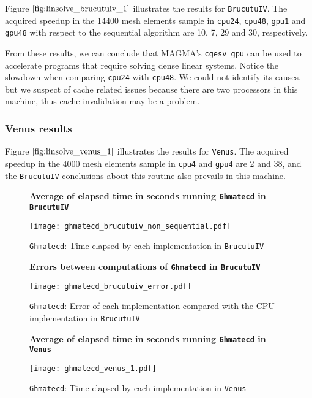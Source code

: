 Figure $\ref{fig:linsolve_brucutuiv_1}$ illustrates the results for \texttt{BrucutuIV}. The acquired speedup in the 14400 mesh 
elements sample in \texttt{cpu24}, \texttt{cpu48}, \texttt{gpu1} and \texttt{gpu48} with respect to 
the sequential algorithm are 10, 7, 29 and 30, respectively. 

From these results, we can conclude that MAGMA's \texttt{cgesv\_gpu} can be used 
to accelerate programs that require solving dense linear systems. Notice the slowdown when comparing 
\texttt{cpu24} with \texttt{cpu48}. We could not identify its causes, but we suspect of cache related issues 
because there are two processors in this machine, thus cache invalidation may be a problem.

\subsubsection{Venus results}

Figure $\ref{fig:linsolve_venus_1}$ illustrates the results 
for \texttt{Venus}. The acquired speedup in the 4000 mesh 
elements sample in \texttt{cpu4} and \texttt{gpu4} are 2 and 38, 
and the \texttt{BrucutuIV} conclusions about this routine also prevails in this machine.

\begin{figure}[ht]
\centering
\textbf{Average of elapsed time in seconds running \texttt{Ghmatecd} in \texttt{BrucutuIV}}\par\medskip
\texttt{[image: ghmatecd\_brucutuiv\_non\_sequential.pdf]}
\caption{\texttt{Ghmatecd}: Time elapsed by each implementation in \texttt{BrucutuIV}}
\label{fig:ghmatecd_brucutuiv_non_sequential}
\end{figure}

\begin{figure}[ht]
\centering
\textbf{Errors between computations of \texttt{Ghmatecd} in \texttt{BrucutuIV}}\par\medskip
\texttt{[image: ghmatecd\_brucutuiv\_error.pdf]}
\caption{\texttt{Ghmatecd}: Error of each implementation compared with the CPU implementation in \texttt{BrucutuIV}}
\label{fig:ghmatecd_brucutuiv_error}
\end{figure}

\begin{figure}[ht]
\centering
\textbf{Average of elapsed time in seconds running \texttt{Ghmatecd} in \texttt{Venus}}\par\medskip
\texttt{[image: ghmatecd\_venus\_1.pdf]}
\caption{\texttt{Ghmatecd}: Time elapsed by each implementation in \texttt{Venus}}
\label{fig:ghmatecd_venus_1}
\end{figure}

